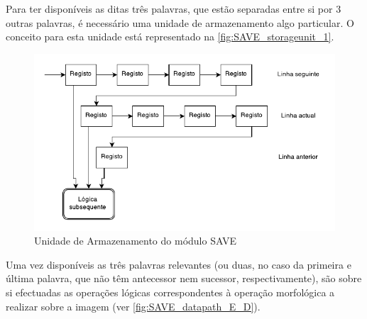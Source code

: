 \documentclass[a4paper]{article}
\begin{document}
Para ter disponíveis as ditas três palavras, que estão separadas entre si por 3 outras palavras, é necessário uma unidade de armazenamento algo particular. O conceito para esta unidade está representado na \autoref{fig:SAVE_storageunit_1}.

\begin{figure}[h]
	\centering
	\includegraphics[width=0.8\linewidth]{SAVE_storageunit_1}
	\caption{Unidade de Armazenamento do módulo SAVE}
	\label{fig:SAVE_storageunit_1}
\end{figure}

Uma vez disponíveis as três palavras relevantes (ou duas, no caso da primeira e última palavra, que não têm antecessor nem sucessor, respectivamente), são sobre si efectuadas as operações lógicas correspondentes à operação morfológica a realizar sobre a imagem (ver \autoref{fig:SAVE_datapath_E_D}).
\end{document}
